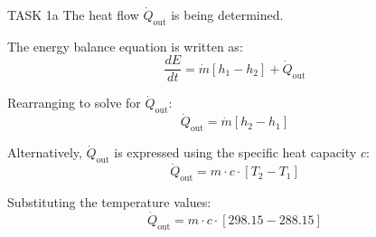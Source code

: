 TASK 1a  
The heat flow \( \dot{Q}_{\text{out}} \) is being determined.  

The energy balance equation is written as:  
\[
\frac{dE}{dt} = \dot{m} \left[ h_1 - h_2 \right] + \dot{Q}_{\text{out}}
\]  

Rearranging to solve for \( \dot{Q}_{\text{out}} \):  
\[
\dot{Q}_{\text{out}} = \dot{m} \left[ h_2 - h_1 \right]
\]  

Alternatively, \( \dot{Q}_{\text{out}} \) is expressed using the specific heat capacity \( c \):  
\[
\dot{Q}_{\text{out}} = m \cdot c \cdot \left[ T_2 - T_1 \right]
\]  

Substituting the temperature values:  
\[
\dot{Q}_{\text{out}} = m \cdot c \cdot \left[ 298.15 - 288.15 \right]
\]